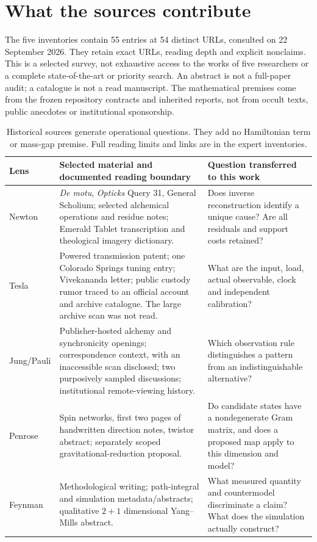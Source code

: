 \section{What the sources contribute}
The five inventories contain 55 entries at 54 distinct URLs, consulted on 22 September 2026. They retain exact URLs, reading depth and explicit nonclaims. This is a selected survey, not exhaustive access to the works of five researchers or a complete state-of-the-art or priority search. An abstract is not a full-paper audit; a catalogue is not a read manuscript. The mathematical premises come from the frozen repository contracts and inherited reports, not from occult texts, public anecdotes or institutional sponsorship.

\begin{table}[ht]
\centering\small
\begin{tabularx}{\textwidth}{@{}p{19mm}Xp{43mm}@{}}
\toprule Lens & Selected material and documented reading boundary & Question transferred to this work \\
\midrule
Newton & \emph{De motu}, \emph{Opticks} Query 31, General Scholium; selected alchemical operations and residue notes; Emerald Tablet transcription and theological imagery dictionary. & Does inverse reconstruction identify a unique cause? Are all residuals and support costs retained? \\
Tesla & Powered transmission patent; one Colorado Springs tuning entry; Vivekananda letter; public custody rumor traced to an official account and archive catalogue. The large archive scan was not read. & What are the input, load, actual observable, clock and independent calibration? \\
Jung/Pauli & Publisher-hosted alchemy and synchronicity openings; correspondence context, with an inaccessible scan disclosed; two purposively sampled discussions; institutional remote-viewing history. & Which observation rule distinguishes a pattern from an indistinguishable alternative? \\
Penrose & Spin networks, first two pages of handwritten direction notes, twistor abstract; separately scoped gravitational-reduction proposal. & Do candidate states have a nondegenerate Gram matrix, and does a proposed map apply to this dimension and model? \\
Feynman & Methodological writing; path-integral and simulation metadata/abstracts; qualitative $2+1$ dimensional Yang--Mills abstract. & What measured quantity and countermodel discriminate a claim? What does the simulation actually construct? \\
\bottomrule
\end{tabularx}
\caption{Historical sources generate operational questions. They add no Hamiltonian term or mass-gap premise. Full reading limits and links are in the expert inventories.}
\end{table}

